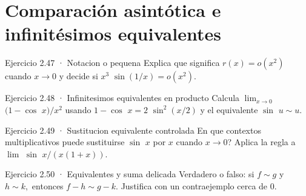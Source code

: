 \documentclass[10pt,a4paper,oneside,openany]{book}
\begin{document}
\section{Comparación asintótica e infinitésimos equivalentes}
\begin{PSevenExerciseFixed}{Ejercicio 2.47 · Notacion o pequena}
Explica que significa \(r(x)=o(x^{2})\) cuando \(x\to 0\) y decide si \(x^{3}\) \(\sin(1/x)=o(x^{2})\).
\end{PSevenExerciseFixed}
\begin{PSevenExerciseFixed}{Ejercicio 2.48 · Infinitesimos equivalentes en producto}
Calcula \(\lim_{x\to 0}\) \((1-\cos\) \(x)/x^{2}\) usando \(1-\cos\) \(x=2\) \(\sin^{2}(x/2)\) y el equivalente \(\sin\) \(u\sim u\).
\end{PSevenExerciseFixed}
\begin{PSevenExerciseFixed}{Ejercicio 2.49 · Sustitucion equivalente controlada}
En que contextos multiplicativos puede sustituirse \(\sin\) \(x\) por \(x\) cuando \(x\to 0\)? Aplica la regla a \(\lim\) \(\sin\) \(x/(x(1+x))\).
\end{PSevenExerciseFixed}
\begin{PSevenExerciseFixed}{Ejercicio 2.50 · Equivalentes y suma delicada}
Verdadero o falso: si \(f\sim g\) y \(h\sim k,\) entonces \(f-h\sim g-k\). Justifica con un contraejemplo cerca de \(0\).
\end{PSevenExerciseFixed}
\end{document}
